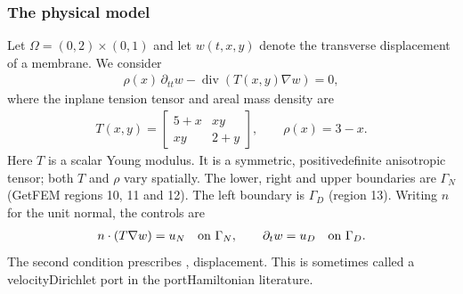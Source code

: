\documentclass[letterpaper,10pt,english]{sphinxmanual}
\begin{document}
\subsubsection{The physical model}
\label{\detokenize{examples/wave:the-physical-model}}
\sphinxAtStartPar
Let \(\Omega=(0,2)\times(0,1)\) and let \(w(t,x,y)\)
denote the transverse displacement of a membrane. We consider
\begin{equation*}
\begin{split}\rho(x)\,\partial_{tt} w
- \operatorname{div}(T(x,y)\nabla w)=0,\end{split}
\end{equation*}
\sphinxAtStartPar
where the in\sphinxhyphen{}plane tension tensor and areal mass density are
\begin{equation*}
\begin{split}T(x,y)=\begin{bmatrix}5+x&xy\\xy&2+y\end{bmatrix},
\qquad \rho(x)=3-x.\end{split}
\end{equation*}
\sphinxAtStartPar
Here \(T\) is  a scalar Young modulus. It is a
symmetric, positive\sphinxhyphen{}definite anisotropic tensor; both \(T\)
and \(\rho\) vary spatially. The lower, right and upper
boundaries are \(\Gamma_N\) (GetFEM regions 10, 11 and 12).
The left boundary is \(\Gamma_D\) (region 13). Writing
\(n\) for the  unit normal, the controls are
\begin{equation*}
\begin{split}n\cdot(T\nabla w)=u_N \quad\hbox{on }\Gamma_N,
\qquad \partial_t w=u_D \quad\hbox{on }\Gamma_D.\end{split}
\end{equation*}
\sphinxAtStartPar
The second condition prescribes ,  displacement.
This is sometimes called a velocity\sphinxhyphen{}Dirichlet port in the
port\sphinxhyphen{}Hamiltonian literature.
\end{document}
